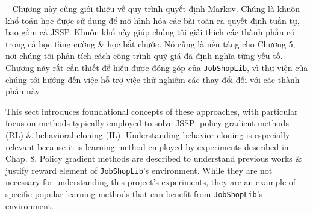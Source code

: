 \documentclass{article}
\begin{document}
\begin{itemize}
    -- Chương này cũng giới thiệu về quy trình quyết định Markov. Chúng là khuôn khổ toán học được sử dụng để mô hình hóa các bài toán ra quyết định tuần tự, bao gồm cả JSSP. Khuôn khổ này giúp chúng tôi giải thích các thành phần có trong cả học tăng cường \& học bắt chước. Nó cũng là nền tảng cho Chương 5, nơi chúng tôi phân tích cách công trình quý giá đã định nghĩa từng yếu tố. Chương này rất cần thiết để hiểu được đóng góp của {\tt JobShopLib}, vì thư viện của chúng tôi hướng đến việc hỗ trợ việc thử nghiệm các thay đổi đối với các thành phần này.

    This sect introduces foundational concepts of these approaches, with particular focus on methods typically employed to solve JSSP: policy gradient methods (RL) \& behavioral cloning (IL). Understanding behavior cloning is especially relevant because it is learning method employed by experiments described in Chap. 8. Policy gradient methods are described to understand previous works \& justify reward element of {\tt JobShopLib}'s environment. While they are not necessary for understanding this project's experiments, they are an example of specific popular learning methods that can benefit from {\tt JobShopLib}'s environment.


\end{itemize}
\end{document}
